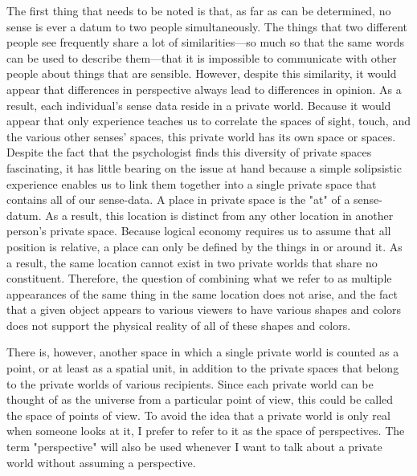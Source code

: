 \documentclass[a4paper,12pt]{book}[2004/02/16]
\theoremstyle{ilemma}
\theoremstyle{itheorem}
\theoremstyle{iother}
\theoremstyle{icorollary}
\theoremstyle{numcorollary}
\theoremstyle{idefinition}
\begin{document}
The first thing that needs to be noted is that, as far as can be determined, no sense is ever a datum to two people simultaneously. The things that two different people see frequently share a lot of similarities—so much so that the same words can be used to describe them—that it is impossible to communicate with other people about things that are sensible. However, despite this similarity, it would appear that differences in perspective always lead to differences in opinion. As a result, each individual's sense data reside in a private world. Because it would appear that only experience teaches us to correlate the spaces of sight, touch, and the various other senses' spaces, this private world has its own space or spaces. Despite the fact that the psychologist finds this diversity of private spaces fascinating, it has little bearing on the issue at hand because a simple solipsistic experience enables us to link them together into a single private space that contains all of our sense-data. A place in private space is the "at" of a sense-datum. As a result, this location is distinct from any other location in another person's private space. Because logical economy requires us to assume that all position is relative, a place can only be defined by the things in or around it. As a result, the same location cannot exist in two private worlds that share no constituent.
Therefore, the question of combining what we refer to as multiple appearances of the same thing in the same location does not arise, and the fact that a given object appears to various viewers to have various shapes and colors does not support the physical reality of all of these shapes and colors.

There is, however, another space in which a single private world is counted as a point, or at least as a spatial unit, in addition to the private spaces that belong to the private worlds of various recipients.
Since each private world can be thought of as the universe from a particular point of view, this could be called the space of points of view. To avoid the idea that a private world is only real when someone looks at it, I prefer to refer to it as the space of perspectives. The term "perspective" will also be used whenever I want to talk about a private world without assuming a perspective.
\end{document}
